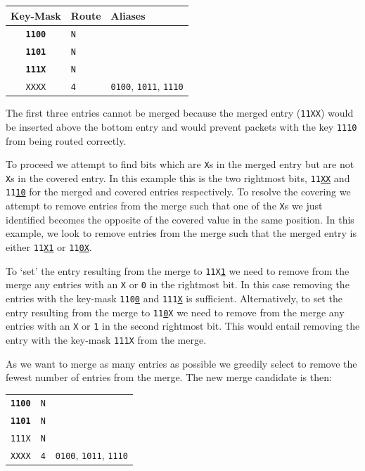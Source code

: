 \documentclass[conference]{IEEEtran}
\newcommand{\mytt}[1]{\texttt{\footnotesize#1}}
\begin{document}
  \begin{table}[H]
    \centering
    \begin{tabular}{c l l}
      \toprule
      Key-Mask & Route & Aliases \\
      \midrule
      \textbf{\texttt{1100}} & \texttt{N} \\
      \textbf{\texttt{1101}} & \texttt{N} \\
      \textbf{\texttt{111X}} & \texttt{N} \\
      \texttt{XXXX} & \texttt{4} & \texttt{0100}, \texttt{1011}, \texttt{1110} \\
      \bottomrule
    \end{tabular}
  \end{table}

  The first three entries cannot be merged because the merged entry (\mytt{11XX}) would be inserted above the bottom entry and would prevent packets with the key \mytt{1110} from being routed correctly.

  To proceed we attempt to find bits which are \mytt{X}s in the merged entry but are not \mytt{X}s in the covered entry.
  In this example this is the two rightmost bits, \mytt{11\underline{XX}} and \mytt{11\underline{10}} for the merged and covered entries respectively.
  To resolve the covering we attempt to remove entries from the merge such that one of the \mytt{X}s we just identified becomes the opposite of the covered value in the same position.
  In this example, we look to remove entries from the merge such that the merged entry is either \mytt{11\underline{X1}} or \mytt{11\underline{0X}}.

  To `set' the entry resulting from the merge to \mytt{11X\underline{1}} we need to remove from the merge any entries with an \mytt{X} or \mytt{0} in the rightmost bit.
  In this case removing the entries with the key-mask \mytt{110\underline{0}} and \mytt{111\underline{X}} is sufficient.
  Alternatively, to set the entry resulting from the merge to \mytt{11\underline{0}X} we need to remove from the merge any entries with an \mytt{X} or \mytt{1} in the second rightmost bit.
  This would entail removing the entry with the key-mask \mytt{111X} from the merge.

  As we want to merge as many entries as possible we greedily select to remove the fewest number of entries from the merge.
  The new merge candidate is then:

  \begin{table}[H]
    \centering
    \begin{tabular}{c l l}
      \toprule
      \textbf{\texttt{1100}} & \texttt{N} \\
      \textbf{\texttt{1101}} & \texttt{N} \\
      \texttt{111X} & \texttt{N} \\
      \texttt{XXXX} & \texttt{4} & \texttt{0100}, \texttt{1011}, \texttt{1110} \\
      \bottomrule
    \end{tabular}
  \end{table}
\end{document}
